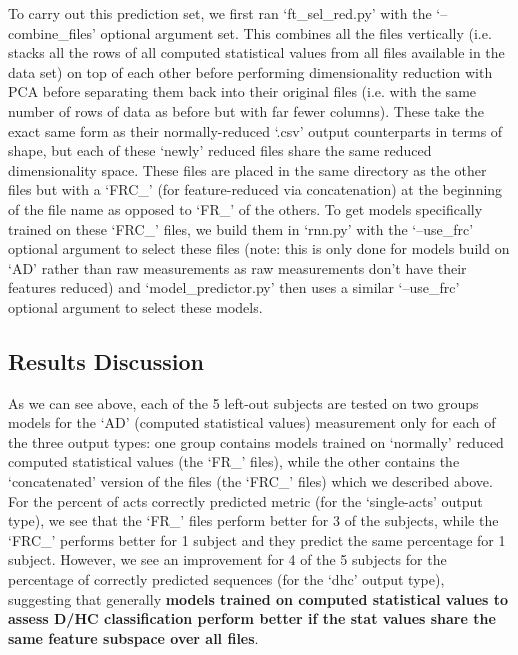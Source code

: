 \documentclass[12pt,twoside]{report}
\begin{document}
\quad To carry out this prediction set, we first ran ‘ft\_sel\_red.py’ with the ‘--combine\_files’ optional argument set. This combines all the files vertically (i.e. stacks all the rows of all computed statistical values from all files available in the data set) on top of each other before performing dimensionality reduction with PCA before separating them back into their original files (i.e. with the same number of rows of data as before but with far fewer columns). These take the exact same form as their normally-reduced ‘.csv’ output counterparts in terms of shape, but each of these ‘newly’ reduced files share the same reduced dimensionality space. These files are placed in the same directory as the other files but with a ‘FRC\_’ (for feature-reduced via concatenation) at the beginning of the file name as opposed to ‘FR\_’ of the others. To get models specifically trained on these ‘FRC\_’ files, we build them in ‘rnn.py’ with the ‘--use\_frc’ optional argument to select these files (note: this is only done for models build on ‘AD’ rather than raw measurements as raw measurements don’t have their features reduced) and ‘model\_predictor.py’ then uses a similar ‘--use\_frc’ optional argument to select these models.

\subsection{Results Discussion}

\quad As we can see above, each of the 5 left-out subjects are tested on two groups models for the ‘AD’ (computed statistical values) measurement only for each of the three output types: one group contains models trained on ‘normally’ reduced computed statistical values (the ‘FR\_’ files), while the other contains the ‘concatenated’ version of the files (the ‘FRC\_’ files) which we described above. For the percent of acts correctly predicted metric (for the ‘single-acts’ output type), we see that the ‘FR\_’ files perform better for 3 of the subjects, while the ‘FRC\_’ performs better for 1 subject and they predict the same percentage for 1 subject. However, we see an improvement for 4 of the 5 subjects for the percentage of correctly predicted sequences (for the ‘dhc’ output type), suggesting that generally \textbf{models trained on computed statistical values to assess D/HC classification perform better if the stat values share the same feature subspace over all files}.\\
\end{document}
